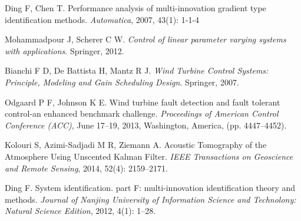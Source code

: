 \documentclass{article}
\begin{document}
\begin{thebibliography}{99}
Ding F, Chen T. Performance analysis of multi-innovation gradient type identification methods. \emph{Automatica}, 2007, 43(1): 1-1-4

Mohammadpour J, Scherer C W. \emph{Control of linear parameter varying systems with applications}. Springer, 2012.

Bianchi F D, De Battista H, Mantz R J. \emph{Wind Turbine Control Systems: Principle, Modeling and Gain Scheduling Design}. Springer, 2007.



Odgaard P F, Johnson K E. Wind turbine fault detection and fault tolerant control-an enhanced benchmark challenge. \emph{Proceedings of American Control Conference (ACC)}, June 17--19, 2013, Washington, America, (pp. 4447--4452).

Kolouri S, Azimi-Sadjadi  M R, Ziemann A. Acoustic Tomography of the Atmosphere Using Unscented Kalman Filter. \emph{IEEE Transactions on Geoscience and Remote Sensing}, 2014, 52(4): 2159--2171.

Ding F. System identification. part F:  multi-innovation identification theory and methods. \emph{Journal of Nanjing University of Information Science and Technolony: Natural Science Edition}, 2012, 4(1): 1--28.





\end{thebibliography}
\end{document}
